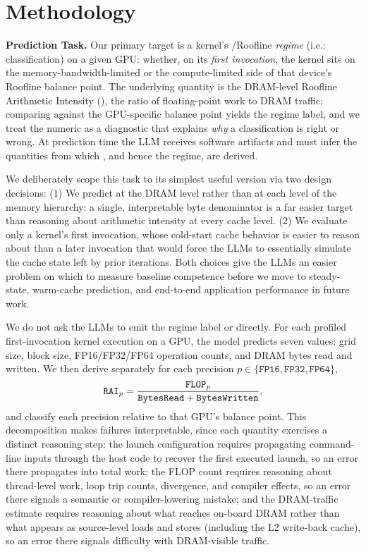 \section{Methodology}
\label{sec:task-methodology}
\label{sec:study-design}

\noindent\textbf{Prediction Task.}
Our primary target is a kernel's \bandwidthbound/\computebound Roofline \textit{regime} (i.e.: classification) on a given GPU: whether, on its \emph{first invocation}, the kernel sits on the memory-bandwidth-limited or the compute-limited side of that device's Roofline balance point.
The underlying quantity is the DRAM-level Roofline Arithmetic Intensity (\rai), the ratio of floating-point work to DRAM traffic; comparing \rai against the GPU-specific balance point yields the regime label, and we treat the numeric \rai as a diagnostic that explains \emph{why} a classification is right or wrong.
At prediction time the LLM receives software artifacts and must infer the quantities from which \rai, and hence the regime, are derived.

We deliberately scope this task to its simplest useful version via two design decisions:
(1) We predict \rai at the DRAM level rather than at each level of the memory hierarchy: a single, interpretable byte denominator is a far easier target than reasoning about arithmetic intensity at every cache level.
(2) We evaluate only a kernel's first invocation, whose cold-start cache behavior is easier to reason about than a later invocation that would force the LLMs to essentially simulate the cache state left by prior iterations.
Both choices give the LLMs an easier problem on which to measure baseline competence before we move to steady-state, warm-cache prediction, and end-to-end application performance in future work.

We do not ask the LLMs to emit the regime label or \rai directly.
For each profiled first-invocation kernel execution on a GPU, the model predicts seven values: grid size, block size, FP16/FP32/FP64 operation counts, and DRAM bytes read and written.
We then derive \rai separately for each precision $p \in \{\texttt{FP16}, \texttt{FP32}, \texttt{FP64}\}$,
\[
\texttt{RAI}_{p}
=
\frac{\texttt{FLOP}_{p}}
     {\texttt{BytesRead} + \texttt{BytesWritten}},
\]
and classify each precision relative to that GPU's balance point.
This decomposition makes failures interpretable, since each quantity exercises a distinct reasoning step: the launch configuration requires propagating command-line inputs through the host code to recover the first executed launch, so an error there propagates into total work; the FLOP count requires reasoning about thread-level work, loop trip counts, divergence, and compiler effects, so an error there signals a semantic or compiler-lowering mistake; and the DRAM-traffic estimate requires reasoning about what reaches on-board DRAM rather than what appears as source-level loads and stores (including the L2 write-back cache), so an error there signals difficulty with DRAM-visible traffic.

